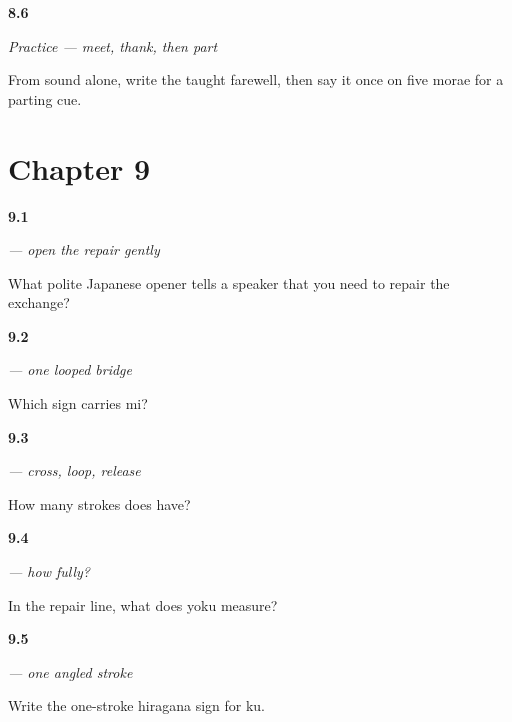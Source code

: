 \noindent\begin{minipage}[t]{\linewidth}
\raggedright
\hypertarget{review-JA-C08-sayounara-four-skills}{\textbf{8.6}} \emph{Practice — meet, thank, then part}\par
\small From sound alone, write the taught farewell, then say it once on five morae for a parting cue.
\end{minipage}\par\medskip

\section*{Chapter 9}

\noindent\begin{minipage}[t]{\linewidth}
\raggedright
\hypertarget{review-JA-C09-sumimasen-job}{\textbf{9.1}} \emph{ — open the repair gently}\par
\small What polite Japanese opener tells a speaker that you need to repair the exchange?
\end{minipage}\par\medskip

\noindent\begin{minipage}[t]{\linewidth}
\raggedright
\hypertarget{review-JA-W09-mi-select}{\textbf{9.2}} \emph{ — one looped bridge}\par
\small Which sign carries mi?
\end{minipage}\par\medskip

\noindent\begin{minipage}[t]{\linewidth}
\raggedright
\hypertarget{review-JA-W09-me-strokes}{\textbf{9.3}} \emph{ — cross, loop, release}\par
\small How many strokes does  have?
\end{minipage}\par\medskip

\noindent\begin{minipage}[t]{\linewidth}
\raggedright
\hypertarget{review-JA-C09-yoku-meaning}{\textbf{9.4}} \emph{ — how fully?}\par
\small In the repair line, what does yoku measure?
\end{minipage}\par\medskip

\noindent\begin{minipage}[t]{\linewidth}
\raggedright
\hypertarget{review-JA-W09-ku-write}{\textbf{9.5}} \emph{ — one angled stroke}\par
\small Write the one-stroke hiragana sign for ku.
\end{minipage}\par\medskip

